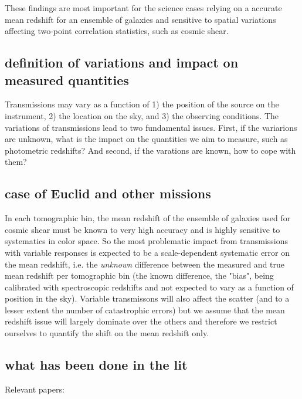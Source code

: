 \documentclass[11pt]{article}
\begin{document}
These findings are most important for the science cases relying on a
accurate mean redshift for an ensemble of galaxies and sensitive to
spatial variations affecting two-point correlation statistics, such as
cosmic shear.

\subsection{definition of variations and impact on measured
quantities}\label{definition-of-variations-and-impact-on-measured-quantities}

Transmissions may vary as a function of 1) the position of the source on
the instrument, 2) the location on the sky, and 3) the observing
conditions. The variations of transmissions lead to two fundamental
issues. First, if the variarions are unknown, what is the impact on the
quantities we aim to measure, such as photometric redshifts? And second,
if the varations are known, how to cope with them?

\subsection{case of Euclid and other
missions}\label{case-of-euclid-and-other-missions}

In each tomographic bin, the mean redshift of the ensemble of galaxies
used for cosmic shear must be known to very high accuracy and is highly
sensitive to systematics in color space. So the most problematic impact
from transmissions with variable responses is expected to be a
scale-dependent systematic error on the mean redshift, i.e. the
\emph{unknown} difference between the measured and true mean redshift
per tomographic bin (the known difference, the "bias", being calibrated
with spectroscopic redshifts and not expected to vary as a function of
position in the sky). Variable transmissons will also affect the scatter
(and to a lesser extent the number of catastrophic errors) but we assume
that the mean redshift issue will largely dominate over the others and
therefore we restrict ourselves to quantify the shift on the mean
redshift only.

\subsection{what has been done in the
lit}\label{what-has-been-done-in-the-lit}

Relevant papers:
\end{document}

